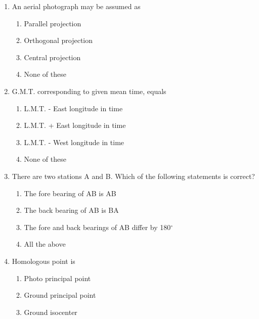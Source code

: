 \documentclass[11pt,a4paper]{article}
\begin{document}
\begin{enumerate}
\\
\item{An aerial photograph may be assumed as}
\begin{enumerate}[label=\Alph*.]
\item{Parallel projection}
\item{Orthogonal projection}
\item{Central projection}
\item{None of these}
\end{enumerate}
\item{G.M.T. corresponding to given mean time, equals}
\begin{enumerate}[label=\Alph*.]
\item{L.M.T. - East longitude in time}
\item{L.M.T. + East longitude in time}
\item{L.M.T. - West longitude in time}
\item{None of these}
\end{enumerate}
\item{There are two stations A and B. Which of the following statements is correct?}
\begin{enumerate}[label=\Alph*.]
\item{The fore bearing of AB is AB}
\item{The back bearing of AB is BA}
\item{The fore and back bearings of AB differ by 180$^\circ$}
\item{All the above}
\end{enumerate}
\item{Homologous point is}
\begin{enumerate}[label=\Alph*.]
\item{Photo principal point}
\item{Ground principal point}
\item{Ground isocenter}

\end{enumerate}
\end{enumerate}
\end{document}
